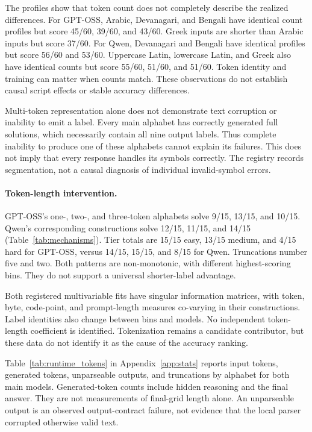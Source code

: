 \documentclass[11pt]{article}
\begin{document}
The profiles show that token count does not completely describe the realized differences. For GPT-OSS, Arabic, Devanagari, and Bengali have identical count profiles but score 45/60, 39/60, and 43/60. Greek inputs are shorter than Arabic inputs but score 37/60. For Qwen, Devanagari and Bengali have identical profiles but score 56/60 and 53/60. Uppercase Latin, lowercase Latin, and Greek also have identical counts but score 55/60, 51/60, and 51/60. Token identity and training can matter when counts match. These observations do not establish causal script effects or stable accuracy differences.

Multi-token representation alone does not demonstrate text corruption or inability to emit a label. Every main alphabet has correctly generated full solutions, which necessarily contain all nine output labels. Thus complete inability to produce one of these alphabets cannot explain its failures. This does not imply that every response handles its symbols correctly. The registry records segmentation, not a causal diagnosis of individual invalid-symbol errors.

\paragraph{Token-length intervention.} GPT-OSS's one-, two-, and three-token alphabets solve 9/15, 13/15, and 10/15. Qwen's corresponding constructions solve 12/15, 11/15, and 14/15 (Table~\ref{tab:mechanisms}). Tier totals are 15/15 easy, 13/15 medium, and 4/15 hard for GPT-OSS, versus 14/15, 15/15, and 8/15 for Qwen. Truncations number five and two. Both patterns are non-monotonic, with different highest-scoring bins. They do not support a universal shorter-label advantage.

Both registered multivariable fits have singular information matrices, with token, byte, code-point, and prompt-length measures co-varying in their constructions. Label identities also change between bins and models. No independent token-length coefficient is identified. Tokenization remains a candidate contributor, but these data do not identify it as the cause of the accuracy ranking.

Table~\ref{tab:runtime_tokens} in Appendix~\ref{app:stats} reports input tokens, generated tokens, unparseable outputs, and truncations by alphabet for both main models. Generated-token counts include hidden reasoning and the final answer. They are not measurements of final-grid length alone. An unparseable output is an observed output-contract failure, not evidence that the local parser corrupted otherwise valid text.
\end{document}
